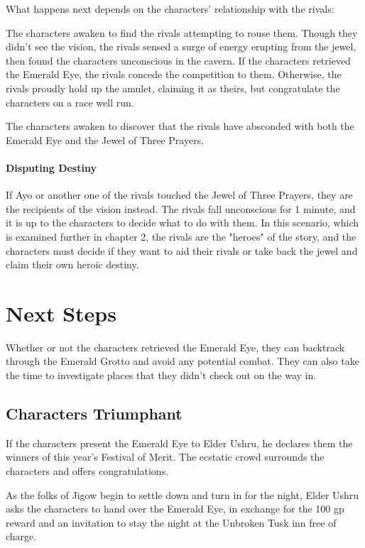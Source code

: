 \documentclass[10pt,a4paper,twoside,bg=print,twocolumn,openany,nodeprecatedcode]{dndbook}
\begin{document}
What happens next depends on the characters' relationship with the rivals:


\begin{description}[nolistsep]
\item[Friendly or Indifferent Rivals.]
The characters awaken to find the rivals attempting to rouse them. Though they didn't see the vision, the rivals sensed a surge of energy erupting from the jewel, then found the characters unconscious in the cavern. If the characters retrieved the Emerald Eye, the rivals concede the competition to them. Otherwise, the rivals proudly hold up the amulet, claiming it as theirs, but congratulate the characters on a race well run.
\item[Hostile Rivals.]
The characters awaken to discover that the rivals have absconded with both the Emerald Eye and the Jewel of Three Prayers.
\end{description}

\paragraph{Disputing Destiny}
If Ayo or another one of the rivals touched the Jewel of Three Prayers, they are the recipients of the vision instead. The rivals fall unconscious for 1 minute, and it is up to the characters to decide what to do with them. In this scenario, which is examined further in chapter 2, the rivals are the "heroes" of the story, and the characters must decide if they want to aid their rivals or take back the jewel and claim their own heroic destiny.

\section{Next Steps}
Whether or not the characters retrieved the Emerald Eye, they can backtrack through the Emerald Grotto and avoid any potential combat. They can also take the time to investigate places that they didn't check out on the way in.

\subsection{Characters Triumphant}
If the characters present the Emerald Eye to Elder Ushru, he declares them the winners of this year's Festival of Merit. The ecstatic crowd surrounds the characters and offers congratulations.

As the folks of Jigow begin to settle down and turn in for the night, Elder Ushru asks the characters to hand over the Emerald Eye, in exchange for the 100 gp reward and an invitation to stay the night at the Unbroken Tusk inn free of charge.
\end{document}
